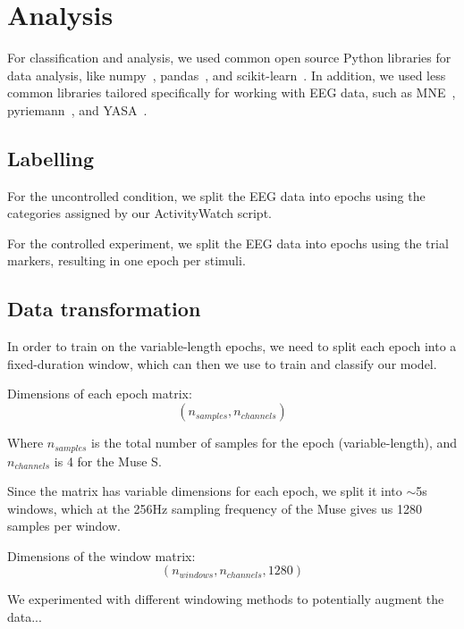 
\section{Analysis}

    For classification and analysis, we used common open source Python libraries for data analysis, like numpy~\cite{harris2020array}, pandas~\cite{reback2020pandas}, and scikit-learn~\cite{scikit-learn}. In addition, we used less common libraries tailored specifically for working with EEG data, such as MNE~\cite{noauthor_mne-python_2020}, pyriemann~\cite{alexandre_barachant_2020_3715511}, and YASA~\cite{vallat_yasa_2020}.

    \subsection{Labelling}
        For the uncontrolled condition, we split the EEG data into epochs using the categories assigned by our ActivityWatch script.

        For the controlled experiment, we split the EEG data into epochs using the trial markers, resulting in one epoch per stimuli.

    \subsection{Data transformation}

        In order to train on the variable-length epochs, we need to split each epoch into a fixed-duration window, which can then we use to train and classify our model.

        Dimensions of each epoch matrix: \[ (n_{samples}, n_{channels}) \]

        Where $n_{samples}$ is the total number of samples for the epoch (variable-length), and $n_{channels}$ is 4 for the Muse S.

        Since the matrix has variable dimensions for each epoch, we split it into $\sim$5s windows, which at the 256Hz sampling frequency of the Muse gives us 1280 samples per window.

        Dimensions of the window matrix: \[ (n_{windows}, n_{channels}, 1280) \]

        We experimented with different windowing methods to potentially augment the data...  

